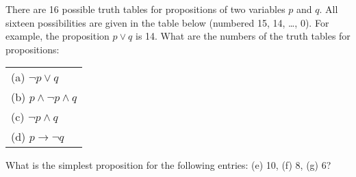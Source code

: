 \documentclass[12pt,addpoints]{exam}
\begin{document}
\begin{questions}
\question There are 16 possible truth tables for propositions of two variables $p$ and $q$.  All sixteen possibilities are given in the table below (numbered 15, 14, \ldots, 0).  For example, the proposition $p \vee q$ is 14. What are the numbers of the truth tables for propositions:\\
 \begin{tabular}{l}
    (a) $\neg p \vee q$ \\
    (b) $p \wedge \neg p \wedge q$ \\
    (c) $\neg p \wedge q $ \\
    (d) $p \rightarrow \neg q$ \\
 \end{tabular}

 What is the simplest proposition for the following entries: (e) 10, (f) 8, (g) 6? \\
 

\end{questions}
\end{document}
